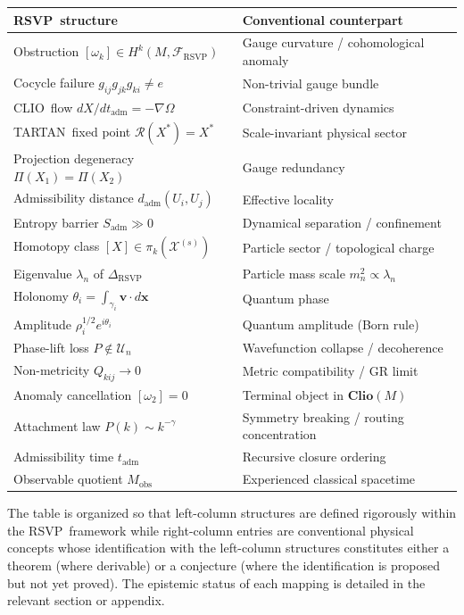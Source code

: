 \documentclass[12pt,a4paper]{article}
\newcommand{\RSVP}{\textrm{RSVP}}
\newcommand{\CLIO}{\textrm{CLIO}}
\newcommand{\TARTAN}{\textrm{TARTAN}}
\newcommand{\Field}{\mathcal{X}}
\newcommand{\Sheaf}{\mathcal{F}}
\begin{document}
\bigskip
{\small
\begin{center}
\begin{tabular}{p{5.5cm}p{6.0cm}}
\toprule
\textbf{\RSVP\ structure} & \textbf{Conventional counterpart}\\
\midrule
Obstruction $[\omega_k]\in H^k(M,\Sheaf_\RSVP)$
  & Gauge curvature / cohomological anomaly\\[2pt]
Cocycle failure $g_{ij}g_{jk}g_{ki}\neq e$
  & Non-trivial gauge bundle\\[2pt]
\CLIO\ flow $dX/dt_\mathrm{adm}=-\nabla\Omega$
  & Constraint-driven dynamics\\[2pt]
\TARTAN\ fixed point $\mathcal{R}(X^\ast)=X^\ast$
  & Scale-invariant physical sector\\[2pt]
Projection degeneracy $\Pi(X_1)=\Pi(X_2)$
  & Gauge redundancy\\[2pt]
Admissibility distance $d_\mathrm{adm}(U_i,U_j)$
  & Effective locality\\[2pt]
Entropy barrier $S_\mathrm{adm}\gg 0$
  & Dynamical separation / confinement\\[2pt]
Homotopy class $[X]\in\pi_k(\Field^{(s)})$
  & Particle sector / topological charge\\[2pt]
Eigenvalue $\lambda_n$ of $\Delta_\RSVP$
  & Particle mass scale $m_n^2\propto\lambda_n$\\[2pt]
Holonomy $\theta_i=\int_{\gamma_i}\mathbf{v}\cdot d\mathbf{x}$
  & Quantum phase\\[2pt]
Amplitude $\rho_i^{1/2}e^{i\theta_i}$
  & Quantum amplitude (Born rule)\\[2pt]
Phase-lift loss $P\notin\mathcal{U}_n$
  & Wavefunction collapse / decoherence\\[2pt]
Non-metricity $Q_{kij}\to 0$
  & Metric compatibility / GR limit\\[2pt]
Anomaly cancellation $[\omega_2]=0$
  & Terminal object in $\mathbf{Clio}(M)$\\[2pt]
Attachment law $P(k)\sim k^{-\gamma}$
  & Symmetry breaking / routing concentration\\[2pt]
Admissibility time $t_\mathrm{adm}$
  & Recursive closure ordering\\[2pt]
Observable quotient $M_\mathrm{obs}$
  & Experienced classical spacetime\\
\bottomrule
\end{tabular}
\end{center}
}

\bigskip

The table is organized so that left-column structures are defined rigorously
within the \RSVP\ framework while right-column entries are conventional physical
concepts whose identification with the left-column structures constitutes either
a theorem (where derivable) or a conjecture (where the identification is
proposed but not yet proved). The epistemic status of each mapping is detailed
in the relevant section or appendix.
\end{document}
